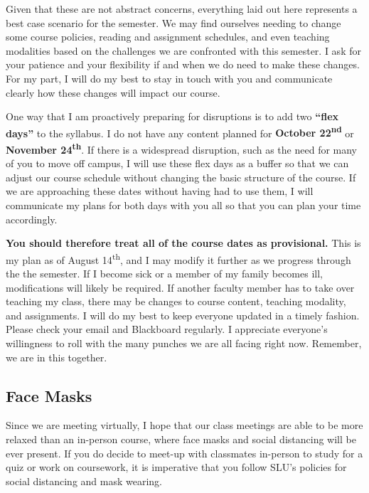 \documentclass[
]{book}
\begin{document}
Given that these are not abstract concerns, everything laid out here represents a best case scenario for the semester. We may find ourselves needing to change some course policies, reading and assignment schedules, and even teaching modalities based on the challenges we are confronted with this semester. I ask for your patience and your flexibility if and when we do need to make these changes. For my part, I will do my best to stay in touch with you and communicate clearly how these changes will impact our course.

One way that I am proactively preparing for disruptions is to add two \textbf{``flex days''} to the syllabus. I do not have any content planned for \textbf{October 22\textsuperscript{nd}} or \textbf{November 24\textsuperscript{th}}. If there is a widespread disruption, such as the need for many of you to move off campus, I will use these flex days as a buffer so that we can adjust our course schedule without changing the basic structure of the course. If we are approaching these dates without having had to use them, I will communicate my plans for both days with you all so that you can plan your time accordingly.

\textbf{You should therefore treat all of the course dates as provisional.} This is my plan as of August 14\textsuperscript{th}, and I may modify it further as we progress through the the semester. If I become sick or a member of my family becomes ill, modifications will likely be required. If another faculty member has to take over teaching my class, there may be changes to course content, teaching modality, and assignments. I will do my best to keep everyone updated in a timely fashion. Please check your email and Blackboard regularly. I appreciate everyone's willingness to roll with the many punches we are all facing right now. Remember, we are in this together.

\hypertarget{face-masks}{%
\subsection{Face Masks}\label{face-masks}}

Since we are meeting virtually, I hope that our class meetings are able to be more relaxed than an in-person course, where face masks and social distancing will be ever present. If you do decide to meet-up with classmates in-person to study for a quiz or work on coursework, it is imperative that you follow SLU's policies for social distancing and mask wearing.
\end{document}
